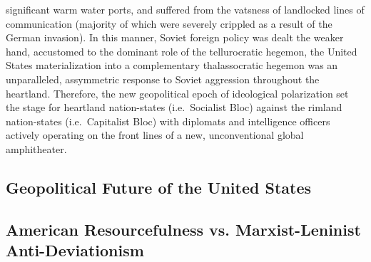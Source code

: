 \documentclass[12pt]{article}
\begin{document}
significant warm water ports, and suffered from the vatsness of landlocked lines of communication (majority of which were severely crippled as a result of the German invasion). In this manner, Soviet foreign policy was dealt the weaker hand, accustomed to the dominant role of the tellurocratic hegemon, the United States materialization into a complementary thalassocratic hegemon was an unparalleled, assymmetric response to Soviet aggression throughout the heartland. Therefore, the new geopolitical epoch of ideological polarization set the stage for heartland nation-states (i.e.\ Socialist Bloc) against the rimland nation-states (i.e.\ Capitalist Bloc) with diplomats and intelligence officers actively operating on the front lines of a new, unconventional global amphitheater.
\begin{center}
  \section{\normalsize Geopolitical Future of the United States}
\end{center}
\begin{center}
\subsection{\normalsize American Resourcefulness vs. Marxist-Leninist Anti-Deviationism}
\end{center}
\end{document}
